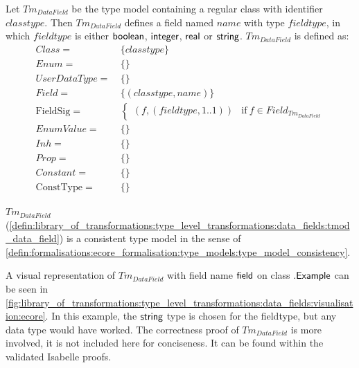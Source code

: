 \begin{defin}
\label{defin:library_of_transformations:type_level_transformations:data_fields:tmod_data_field}
Let $Tm_{DataField}$ be the type model containing a regular class with identifier $classtype$. Then $Tm_{DataField}$ defines a field named $name$ with type $fieldtype$, in which $fieldtype$ is either $\mathsf{boolean}$, $\mathsf{integer}$, $\mathsf{real}$ or $\mathsf{string}$. $Tm_{DataField}$ is defined as:
\begin{align*}
Class =\ &\{classtype\} \\
Enum =\ &\{\} \\
UserDataType =\ &\{\} \\
Field =\ &\{(classtype, name)\} \\
\mathrm{FieldSig} =\ &\begin{cases}
    (f, (fieldtype, 1..1)) &\mathrm{if}\ f \in Field_{Tm_{DataField}}
\end{cases} \\
EnumValue =\ &\{\} \\
Inh =\ &\{\} \\
Prop =\ &\{\} \\
Constant =\ &\{\} \\
\mathrm{ConstType} =\ &\{\}
\end{align*}
\end{defin}

\begin{thm}
\label{defin:library_of_transformations:type_level_transformations:data_fields:tmod_data_field_correct}
$Tm_{DataField}$ (\cref{defin:library_of_transformations:type_level_transformations:data_fields:tmod_data_field}) is a consistent type model in the sense of \cref{defin:formalisations:ecore_formalisation:type_models:type_model_consistency}.
\end{thm}

A visual representation of $Tm_{DataField}$ with field name $\mathsf{field}$ on class $.\mathsf{Example}$ can be seen in \cref{fig:library_of_transformations:type_level_transformations:data_fields:visualisation:ecore}. In this example, the $\mathsf{string}$ type is chosen for the fieldtype, but any data type would have worked. The correctness proof of $Tm_{DataField}$ is more involved, it is not included here for conciseness. It can be found within the validated Isabelle proofs.


